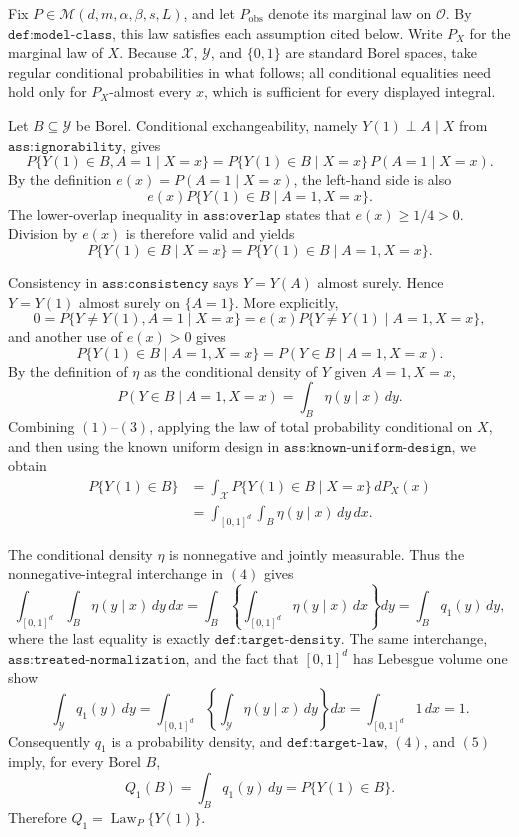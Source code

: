 Fix \(P\in\mathcal M(d,m,\alpha,\beta,s,L)\), and let \(P_{\mathrm{obs}}\) denote its marginal law on \(\mathcal O\).  By \(\texttt{def:model-class}\), this law satisfies each assumption cited below.  Write \(P_X\) for the marginal law of \(X\).  Because \(\mathcal X\), \(\mathcal Y\), and \(\{0,1\}\) are standard Borel spaces, take regular conditional probabilities in what follows; all conditional equalities need hold only for \(P_X\)-almost every \(x\), which is sufficient for every displayed integral.

Let \(B\subseteq\mathcal Y\) be Borel.  Conditional exchangeability, namely \(Y(1)\perp A\mid X\) from \(\texttt{ass:ignorability}\), gives
\[
 P\{Y(1)\in B,A=1\mid X=x\}
 =P\{Y(1)\in B\mid X=x\}\,P(A=1\mid X=x).
\]
By the definition \(e(x)=P(A=1\mid X=x)\), the left-hand side is also
\[
 e(x)P\{Y(1)\in B\mid A=1,X=x\}.
\]
The lower-overlap inequality in \(\texttt{ass:overlap}\) states that \(e(x)\ge 1/4>0\).  Division by \(e(x)\) is therefore valid and yields
\[
 P\{Y(1)\in B\mid X=x\}
 =P\{Y(1)\in B\mid A=1,X=x\}.
\tag{1}
\]

Consistency in \(\texttt{ass:consistency}\) says \(Y=Y(A)\) almost surely.  Hence \(Y=Y(1)\) almost surely on \(\{A=1\}\).  More explicitly,
\[
 0=P\{Y\ne Y(1),A=1\mid X=x\}
   =e(x)P\{Y\ne Y(1)\mid A=1,X=x\},
\]
and another use of \(e(x)>0\) gives
\[
 P\{Y(1)\in B\mid A=1,X=x\}
 =P(Y\in B\mid A=1,X=x).
\tag{2}
\]
By the definition of \(\eta\) as the conditional density of \(Y\) given \(A=1,X=x\),
\[
 P(Y\in B\mid A=1,X=x)=\int_B\eta(y\mid x)\,dy.
\tag{3}
\]
Combining \((1)\)--\((3)\), applying the law of total probability conditional on \(X\), and then using the known uniform design in \(\texttt{ass:known-uniform-design}\), we obtain
\[
 \begin{aligned}
 P\{Y(1)\in B\}
 &=\int_{\mathcal X}P\{Y(1)\in B\mid X=x\}\,dP_X(x)\\
 &=\int_{[0,1]^d}\int_B\eta(y\mid x)\,dy\,dx.
 \end{aligned}
\tag{4}
\]

The conditional density \(\eta\) is nonnegative and jointly measurable.  Thus the nonnegative-integral interchange in \((4)\) gives
\[
 \int_{[0,1]^d}\int_B\eta(y\mid x)\,dy\,dx
 =\int_B\left\{\int_{[0,1]^d}\eta(y\mid x)\,dx\right\}dy
 =\int_B q_1(y)\,dy,
\tag{5}
\]
where the last equality is exactly \(\texttt{def:target-density}\).  The same interchange, \(\texttt{ass:treated-normalization}\), and the fact that \([0,1]^d\) has Lebesgue volume one show
\[
 \int_{\mathcal Y}q_1(y)\,dy
 =\int_{[0,1]^d}\left\{\int_{\mathcal Y}\eta(y\mid x)\,dy\right\}dx
 =\int_{[0,1]^d}1\,dx=1.
\]
Consequently \(q_1\) is a probability density, and \(\texttt{def:target-law}\), \((4)\), and \((5)\) imply, for every Borel \(B\),
\[
 Q_1(B)=\int_Bq_1(y)\,dy=P\{Y(1)\in B\}.
\]
Therefore \(Q_1=\operatorname{Law}_P\{Y(1)\}\).

